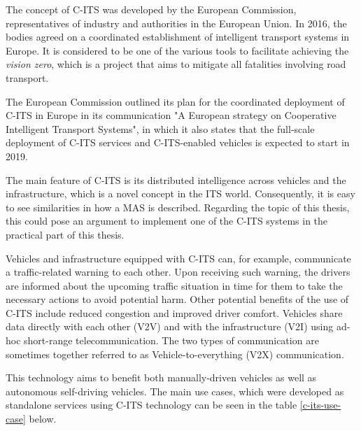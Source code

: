 \documentclass[0main.tex]{subfiles}
\begin{document}
The concept of C-ITS was developed by the European Commission, representatives of industry and 
authorities in the European Union. In 2016, the bodies agreed on a coordinated establishment of intelligent
transport systems in Europe. It is considered to be one of the various tools to facilitate achieving 
the \emph{vision zero}, which is a project that aims to mitigate all fatalities involving road 
transport.

The European Commission outlined its plan for the coordinated deployment of C-ITS in Europe in
its communication "A European strategy on Cooperative Intelligent Transport Systems", in which
it also states that the full-scale deployment of C-ITS services and C-ITS-enabled vehicles is
expected to start in 2019.

The main feature of C-ITS is its distributed intelligence across vehicles and the infrastructure, 
which is a novel concept in the ITS world. Consequently, it is easy to see similarities in how a
MAS is described. Regarding the topic of this thesis, this could pose an argument to
implement one of the C-ITS systems in the practical part of this thesis.

Vehicles and infrastructure equipped with C-ITS can, for example, communicate a traffic-related warning to each
other. Upon receiving such warning, the drivers are informed about the upcoming traffic situation in time for
them to take the necessary actions to avoid potential harm. Other potential benefits
of the use of C-ITS include reduced congestion and improved driver comfort. Vehicles 
share data directly with each other (V2V) and with the infrastructure (V2I) using ad-hoc
short-range telecommunication. The two types of communication are sometimes together referred 
to as Vehicle-to-everything (V2X) communication.

This technology aims to benefit both manually-driven vehicles 
as well as autonomous self-driving vehicles. The main use cases, which were developed as
standalone services using C-ITS technology can be seen in the table \ref{c-its-use-case}
below.
\end{document}

